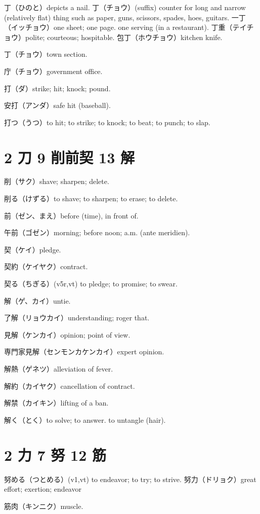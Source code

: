 丁（ひのと）depicts a nail.
丁（チョウ）(suffix)
counter for long and narrow (relatively flat) thing
such as paper, guns, scissors, spades, hoes, guitars.
一丁（イッチョウ）one sheet; one page.
one serving (in a restaurant).
丁重（テイチョウ）polite; courteous; hospitable.
包丁（ホウチョウ）kitchen knife.

丁（チョウ）town section.

庁（チョウ）government office.

打（ダ）strike; hit; knock; pound.

安打（アンダ）safe hit (baseball).

打つ（うつ）to hit; to strike; to knock; to beat; to punch; to slap.

\section{2 刀 9 削前契 13 解}

削（サク）shave; sharpen; delete.

削る（けずる）to shave; to sharpen; to erase; to delete.

前（ゼン、まえ）before (time), in front of.

午前（ゴゼン）morning; before noon; a.m. (ante meridien).

契（ケイ）pledge.

契約（ケイヤク）contract.

契る（ちぎる）(v5r,vt) to pledge; to promise; to swear.

解（ゲ、カイ）untie.

了解（リョウカイ）understanding; roger that.

見解（ケンカイ）opinion; point of view.

専門家見解（センモンカケンカイ）expert opinion.

解熱（ゲネツ）alleviation of fever.

解約（カイヤク）cancellation of contract.

解禁（カイキン）lifting of a ban.

解く（とく）to solve; to answer. to untangle (hair).

\section{2 力 7 努 12 筋}

努める（つとめる）(v1,vt) to endeavor; to try; to strive.
努力（ドリョク）great effort; exertion; endeavor

筋肉（キンニク）muscle.

